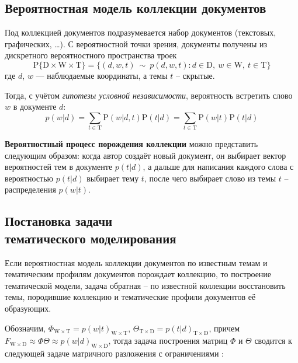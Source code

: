 \documentclass[a4paper, 14pt]{extarticle}
\begin{document}
   	\subsection{Вероятностная модель коллекции документов}
   	Под коллекцией документов подразумевается набор документов (текстовых, графических, \dots). С вероятностной точки зрения, документы получены из дискретного вероятностного пространства троек \cite{Voron15slides} \begin{equation} \mathrm{P}\{\mathrm{D} \times \mathrm{W} \times \mathrm{T}\} = \{(d, w, t)~\sim~p(d, w, t): d \in \mathrm{D},~w \in \mathrm{W},~t \in \mathrm{T}\} \end{equation}
   	где $d$, $w$ — наблюдаемые координаты, а темы $t$ -- скрытые.
   	
	Тогда, с учётом \emph{гипотезы условной независимости}, вероятность встретить слово $w$ в документе $d$:
   	\begin{equation}
   	p(w|d)=\sum_{t \in \mathrm{T}} \mathrm{P}(w|d, t)\mathrm{P}(t|d) = \sum_{t \in \mathrm{T}} \mathrm{P}(w|t)\mathrm{P}(t|d)
   	\end{equation}
   	
   	{\bf Вероятностный процесс порождения коллекции} можно представить следующим образом: когда автор создаёт новый документ, он выбирает вектор вероятностей тем в документе $p(t|d)$, а дальше для написания каждого слова с вероятностью $p(t|d)$ выбирает тему $t$, после чего выбирает слово из темы $t$ -- распределения $p(w|t)$.
	
   	\subsection{Постановка задачи \\ тематического моделирования}
   	Если вероятностная модель коллекции документов по известным темам и тематическим профилям документов порождает коллекцию, то построение тематической модели, задача обратная -- по известной коллекции восстановить темы, породившие коллекцию и тематические профили документов её образующих.
   	
   	Обозначим, $\Phi_{\mathrm{W} \times \mathrm{T}} = p(w|t)_{\mathrm{W} \times \mathrm{T}}$, $\Theta_{\mathrm{T} \times \mathrm{D}} = p(t|d)_{\mathrm{T} \times \mathrm{D}}$, причем $F_{\mathrm{W} \times \mathrm{D}} \approx \Phi \Theta \approx p(w|d)_{\mathrm{W} \times \mathrm{D}}$, тогда задача построения матриц $\Phi$ и $\Theta$ сводится к следующей задаче матричного разложения с ограничениями \cite{Voron15slides}:
   	
\end{document}
